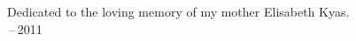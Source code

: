 
\thispagestyle{empty}

\vspace*{3cm}

\begin{center}
    Dedicated to the loving memory of my mother Elisabeth Kyas. \\ \,--\,2011
\end{center}